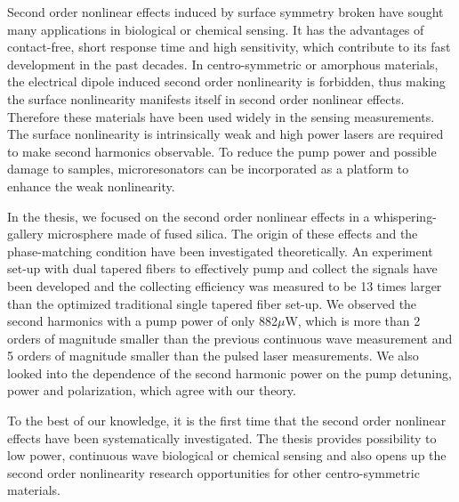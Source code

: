 \begin{eabstract}
Second order nonlinear effects induced by surface symmetry broken have sought many applications in biological or chemical sensing. It has the advantages of contact-free, short response time and high sensitivity, which contribute to its fast development in the past decades. In centro-symmetric or amorphous materials, the electrical dipole induced second order nonlinearity is forbidden, thus making the surface nonlinearity manifests itself in second order nonlinear effects. Therefore these materials have been used widely in the sensing measurements. The surface nonlinearity is intrinsically weak and high power lasers are required to make second harmonics observable. To reduce the pump power and possible damage to samples, microresonators can be incorporated as a platform to enhance the weak nonlinearity.

In the thesis, we focused on the second order nonlinear effects in a whispering-gallery microsphere made of fused silica. The origin of these effects and the phase-matching condition have been investigated theoretically. An experiment set-up with dual tapered fibers to effectively pump and collect the signals have been developed and the collecting efficiency was measured to be 13 times larger than the optimized traditional single tapered fiber set-up. We observed the second harmonics with a pump power of only 882$\mu$W, which is more than 2 orders of magnitude smaller than the previous continuous wave measurement and 5 orders of magnitude smaller than the pulsed laser measurements. We also looked into the dependence of the second harmonic power on the pump detuning, power and polarization, which agree with our theory.

To the best of our knowledge, it is the first time that the second order nonlinear effects have been systematically investigated. The thesis provides possibility to low power, continuous wave biological or chemical sensing and also opens up the second order nonlinearity research opportunities for other centro-symmetric materials.
\end{eabstract}

